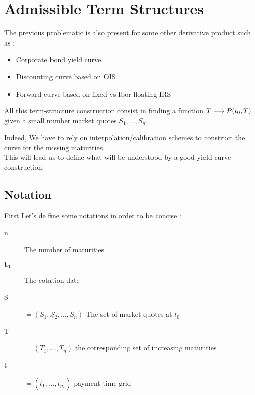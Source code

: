 

\section{Admissible Term Structures}
\label{sec:admissible-curve}
The previous problematic is also present  for some other derivative product such
as : 
\begin{itemize}
\item Corporate bond yield curve
\item Discounting curve based on OIS
\item Forward curve based on fixed-vs-Ibor-floating IRS
\end{itemize}
All this term-structure construction consist in finding a function $T \longrightarrow P(t_0,T)$
given a small number market quotes $S_1,...,S_n$. 

\quad Indeed, We have to rely on interpolation/calibration schemes to construct the
curve for the  missing maturities.\\
\quad This will lead us to define what will be understood by a good yield curve
construction.\\

\subsection{Notation}
\label{sec:notation}
First Let's de fine some notations in order to be concise :
\begin{description}
\item[n] The number of maturities
\item[$\mathbf{t_0}$] The cotation date
\item[S] $=(S_1,S_2,\dots,S_n)$ The set of market quotes at $t_0$
\item[T] $=(T_1,\dots,T_n)$ the corresponding set of increasing maturities 
\item[t] $=(t_1,\dots,t_{p_n})$ payment time grid
\end{description}

